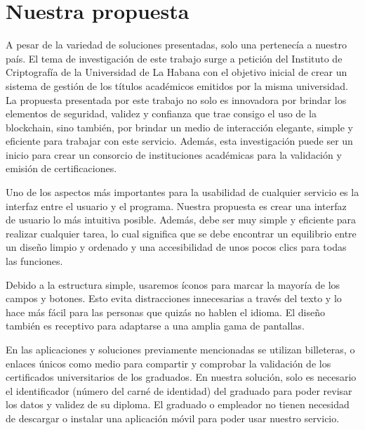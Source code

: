 
\section{Nuestra propuesta}
A pesar de la variedad de soluciones presentadas, solo una pertenecía a nuestro país. El tema de investigación de este trabajo surge a petición del Instituto de Criptografía de la Universidad de La Habana con el objetivo inicial de crear un sistema de gestión de los títulos académicos emitidos por la misma universidad. La propuesta presentada por este trabajo no solo es innovadora por brindar los elementos de seguridad, validez y confianza que trae consigo el uso de la blockchain, sino también, por brindar un medio de interacción elegante, simple y eficiente para trabajar con este servicio. Además, esta investigación puede ser un inicio para crear un consorcio de instituciones académicas para la validación y emisión de certificaciones.

Uno de los aspectos más importantes para la usabilidad de cualquier servicio es la interfaz entre el usuario y el programa. Nuestra propuesta es crear una interfaz de usuario lo más intuitiva posible. Además, debe ser muy simple y eficiente para realizar cualquier tarea, lo cual significa que se debe encontrar un equilibrio entre un diseño limpio y ordenado y una accesibilidad de unos pocos clics para todas las funciones.

Debido a la estructura simple, usaremos íconos para marcar la mayoría de los campos y botones. Esto evita distracciones innecesarias a través del texto y lo hace más fácil para las personas que quizás no hablen el idioma. El diseño también es receptivo para adaptarse a una amplia gama de pantallas.

En las aplicaciones y soluciones previamente mencionadas se utilizan billeteras, o enlaces únicos como medio para compartir y comprobar la validación de los certificados universitarios de los graduados. En nuestra solución, solo es necesario el identificador (número del carné de identidad) del graduado para poder revisar los datos y validez de su diploma. El graduado o empleador no tienen necesidad de descargar o instalar una aplicación móvil para poder usar nuestro servicio.

